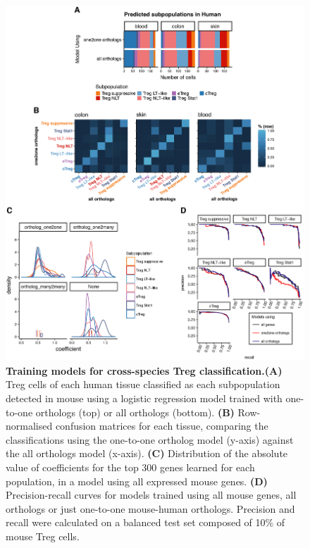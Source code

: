 \begin{figure}[pt] 
\centering    
\includegraphics[width=1.0\textwidth]{Chapter2/Figs/chap2_fig6.png} %
\caption[Examining models for cross-species Treg classification]{\textbf{Training models for cross-species Treg classification.}\newline\textbf{(A)} Treg cells of each human tissue classified as each subpopulation detected in mouse using a logistic regression model trained with one-to-one orthologs (top) or all orthologs (bottom). \textbf{(B)} Row-normalised confusion matrices for each tissue, comparing the classifications using the one-to-one ortholog model (y-axis) against the all orthologs model (x-axis). \textbf{(C)} Distribution of the absolute value of coefficients for the top 300 genes learned for each population, in a model using all expressed mouse genes. \textbf{(D)} Precision-recall curves for models trained using all mouse genes, all orthologs or just one-to-one mouse-human orthologs. Precision and recall were calculated on a balanced test set composed of 10\% of mouse Treg cells.}
\label{fig:chap2_fig6}
\end{figure}

